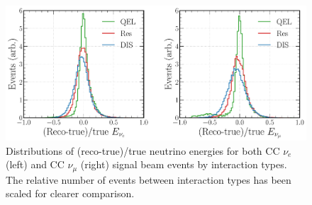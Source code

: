 \begin{figure} %
    \includegraphics[width=\textwidth]{diagrams/7-results/final_energy_frac_split.pdf}
    \caption[Distributions of (reco-true)/true neutrino energies by interaction type]
    {Distributions of (reco-true)/true neutrino energies for both CC $\nu_{e}$ (left) and CC
        $\nu_{\mu}$ (right) signal beam events by interaction types. The relative number of events
        between interaction types has been scaled for clearer comparison.}
    \label{fig:final_energy_frac_split}
\end{figure}

\begin{table}
    \caption[Summary of CC $\nu_{e}$ and CC $\nu_{\mu}$ neutrino energy resolutions]
    {Summary of CC $\nu_{e}$ and CC $\nu_{\mu}$ neutrino energy resolutions. Shown for each sample
        are the resolutions for \emph{all} selected events, the true \emph{signal} selected events
        and the three dominant \emph{signal} interaction type components, QEL, Res, and DIS. The
        resolutions are calculated from the standard deviations of gaussian fits made to the
        distributions shown in  and
        .}
    \label{tab:energy_resolutions}
\end{table}

